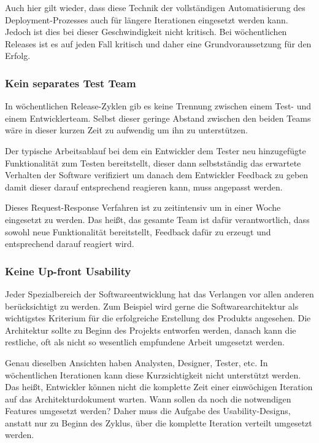 Auch hier gilt wieder, dass diese Technik der vollständigen Automatisierung des De\-ploy\-ment-Pro\-zes\-ses auch für längere Iterationen eingesetzt werden kann. Jedoch ist dies bei dieser Geschwindigkeit nicht kritisch. Bei wöchentlichen Releases ist es auf jeden Fall kritisch und daher eine Grundvoraussetzung für den Erfolg.

\subsubsection{Kein separates Test Team}
In wöchentlichen Release-Zyklen gib es keine Trennung zwischen einem Test- und einem Entwicklerteam. Selbst dieser geringe Abstand zwischen den beiden Teams wäre in dieser kurzen Zeit zu aufwendig um ihn zu unterstützen. 

Der typische Arbeitsablauf bei dem ein Entwickler dem Tester neu hinzugefügte Funktionalität zum Testen bereitstellt, dieser dann selbstständig das erwartete Verhalten der Software verifiziert um danach dem Entwickler Feedback zu geben damit dieser darauf entsprechend reagieren kann, muss angepasst werden. 

Dieses Request-Response Verfahren ist zu zeitintensiv um in einer Woche eingesetzt zu werden. Das heißt, das gesamte Team ist dafür verantwortlich, dass sowohl neue Funktionalität bereitstellt, Feedback dafür zu erzeugt und entsprechend darauf reagiert wird.

\subsubsection{Keine Up-front Usability}
Jeder Spezialbereich der Softwareentwicklung hat das Verlangen vor allen anderen berücksichtigt zu werden. Zum Beispiel wird gerne die Softwarearchitektur als wichtigstes Kriterium für die erfolgreiche Erstellung des Produkts angesehen. Die Architektur sollte zu Beginn des Projekts entworfen werden, danach kann die restliche, oft als nicht so wesentlich empfundene Arbeit umgesetzt werden. 

Genau dieselben Ansichten haben Analysten, Designer, Tester, etc. In wöchentlichen Iterationen kann diese Kurzsichtigkeit nicht unterstützt werden. Das heißt, Entwickler können nicht die komplette Zeit einer einwöchigen Iteration auf das Architekturdokument warten. Wann sollen da noch die notwendigen Features umgesetzt werden? 
Daher muss die Aufgabe des Usability-Designs, anstatt nur zu Beginn des Zyklus, über die komplette Iteration verteilt umgesetzt werden.

